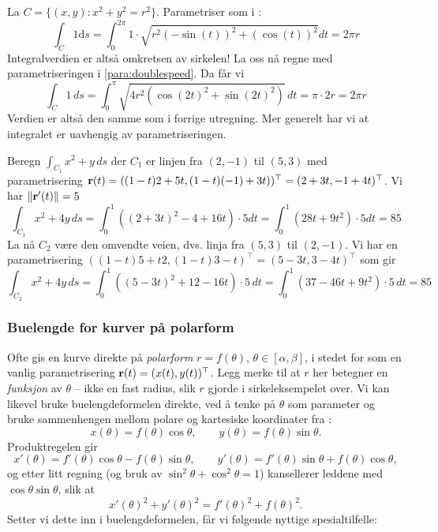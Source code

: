 \begin{eks}{}
La $C = \{(x,y) \colon x^2+y^2 = r^2\}$. Parametriser som i :
\[\int_C 1 \mathrm{d}s =\int_0^{2\pi} 1\cdot \sqrt{r^2 (-\sin(t))^2 + (\cos (t))^2}dt = 2\pi r \]
Integralverdien er altså omkretsen av sirkelen! La oss nå regne med parametriseringen i \eqref{para:doublespeed}. Da får vi
\[\int_C 1\, d s = \int_0^{\pi} \sqrt{4r^2(\cos (2t)^2+\sin (2t)^2)}\, dt = \pi \cdot 2r = 2\pi r\]
Verdien er altså den samme som i forrige utregning. Mer generelt har vi at integralet er uavhengig av parametriseringen.
\end{eks}


\begin{eks}{}
Beregn $\int_{C_1} x^2+y\, ds$ der $C_1$ er linjen fra $(2,-1)$ til $(5,3)$ med parametrisering $\mathbf{r}(t)=((1-t)2+5t, (1-t)(-1)+3t))^\top=(2+3t,-1+4t)^\top$. Vi har $\lVert \mathbf{r}'(t)\rVert = 5$
\[\int_{C_1} x^2+4y\, ds = \int_0^1 ((2+3t)^2-4+16t)\cdot 5 dt =\int_0^1 (28t+9t^2)\cdot 5 dt = 85\]
La nå $C_2$ være den omvendte veien, dvs. linja fra $(5,3)$ til $(2,-1)$. Vi har en parametrisering $((1-t)5+t2,(1-t)3-t)^\top=(5-3t,3-4t)^\top$ som gir
\[\int_{C_2} x^2+4y\, ds = \int_0^1 ((5-3t)^2+12-16t)\cdot 5\, dt= \int_0^1 (37-46t+9t^2)\cdot 5\, dt= 85\]
\end{eks}

\subsubsection{Buelengde for kurver på polarform}
Ofte gis en kurve direkte på \emph{polarform} $r=f(\theta)$, $\theta \in [\alpha,\beta]$, i stedet for som en vanlig parametrisering $\mathbf{r}(t)=(x(t),y(t))^\top$. Legg merke til at $r$ her betegner en \emph{funksjon} av $\theta$ -- ikke en fast radius, slik $r$ gjorde i sirkeleksempelet over. Vi kan likevel bruke buelengdeformelen direkte, ved å tenke på $\theta$ som parameter og bruke sammenhengen mellom polare og kartesiske koordinater fra :
\[
x(\theta) = f(\theta)\cos\theta, \qquad y(\theta) = f(\theta)\sin\theta.
\]
Produktregelen gir
\[
x'(\theta) = f'(\theta)\cos\theta - f(\theta)\sin\theta, \qquad y'(\theta) = f'(\theta)\sin\theta + f(\theta)\cos\theta,
\]
og etter litt regning (og bruk av $\sin^2\theta + \cos^2\theta = 1$) kansellerer leddene med $\cos\theta\sin\theta$, slik at
\[
x'(\theta)^2 + y'(\theta)^2 = f'(\theta)^2 + f(\theta)^2.
\]
Setter vi dette inn i buelengdeformelen, får vi følgende nyttige spesialtilfelle:


